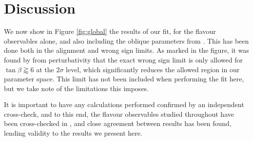 \documentclass[a4paper,12pt]{article}
\begin{document}
\section{Discussion}
\label{sec:discuss}
We now show in Figure \ref{fig:global} the results of our fit, for the flavour observables alone, and also including the oblique parameters from \cite{james}.
This has been done both in the alignment and wrong sign limits. 
As marked in the figure, it was found by \cite{oliver} from perturbativity that the exact wrong sign limit is only allowed for $\tan\beta\gtrapprox6$ at the $2\sigma$ level, which significantly reduces the allowed region in our parameter space. 
This limit has not been included when performing the fit here, but we take note of the limitations this imposes.

It is important to have any calculations performed confirmed by an independent cross-check, and to this end, the flavour observables studied throughout have been cross-checked in \cite{tom}, and close agreement between results has been found, lending validity to the results we present here. 
\end{document}
